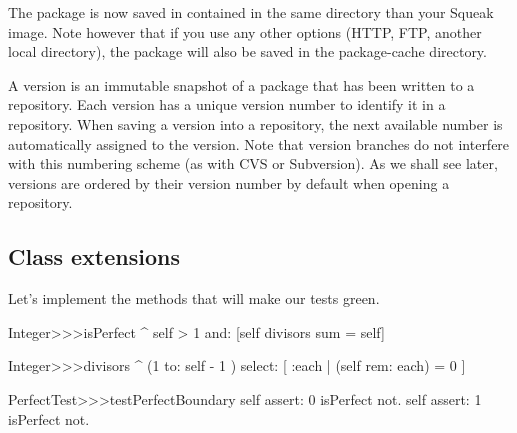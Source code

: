 \documentclass[a4paper,10pt,twoside]{book}
\begin{document}
The  package is now saved in  contained in the same directory than your Squeak image. Note however that if you use any other options (HTTP, FTP, another local directory), the package will also be saved in the package-cache directory. 



A version is an immutable snapshot of a package that has been written to a repository. Each version has a unique version number to identify it in a repository.  When saving a version into a repository, the next available number is automatically assigned to the version. Note that version branches do not interfere with this numbering scheme (as with CVS or Subversion). As we shall see later, versions are ordered by their version number by default when opening a repository.

\subsection{Class extensions}

Let's implement the methods that will make our tests green.


\begin{code}{}
Integer>>>isPerfect
	^ self > 1 and: [self divisors sum = self]

Integer>>>divisors
	^ (1 to: self - 1 ) select: [ :each | (self rem: each) = 0 ]

PerfectTest>>>testPerfectBoundary
	self assert: 0 isPerfect not.
	self assert: 1 isPerfect not.
\end{code}
\end{document}
